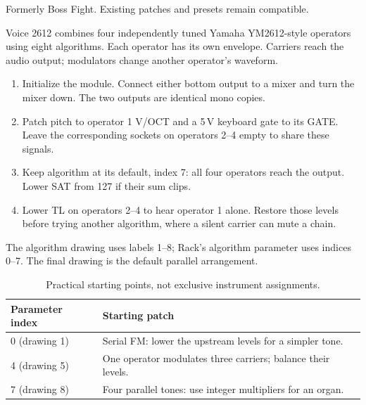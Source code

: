 Formerly Boss Fight. Existing patches and presets remain compatible.

Voice 2612 combines four independently tuned Yamaha YM2612-style operators
using eight algorithms. Each operator has its own envelope. Carriers reach
the audio output; modulators change another operator's waveform.

\begin{enumerate}
\item Initialize the module. Connect either bottom output to a mixer and
turn the mixer down. The two outputs are identical mono copies.
\item Patch pitch to operator 1 V/OCT and a 5\,V keyboard gate to its GATE.
Leave the corresponding sockets on operators 2--4 empty to share these signals.
\item Keep algorithm at its default, index 7: all four operators reach the
output. Lower SAT from 127 if their sum clips.
\item Lower TL on operators 2--4 to hear operator 1 alone. Restore those
levels before trying another algorithm, where a silent carrier can mute a chain.
\end{enumerate}

The algorithm drawing uses labels 1--8; Rack's algorithm parameter uses
indices 0--7. The final drawing is the default parallel arrangement.

\begin{table}[ht]\centering
\begin{tabularx}{\textwidth}{@{}lX@{}}
\toprule Parameter index & Starting patch \\\midrule
0 (drawing 1) & Serial FM: lower the upstream levels for a simpler tone. \\
4 (drawing 5) & One operator modulates three carriers; balance their levels. \\
7 (drawing 8) & Four parallel tones: use integer multipliers for an organ. \\
\bottomrule
\end{tabularx}
\caption{Practical starting points, not exclusive instrument assignments.}
\label{tab:fm-algorithm-instruments}
\end{table}

